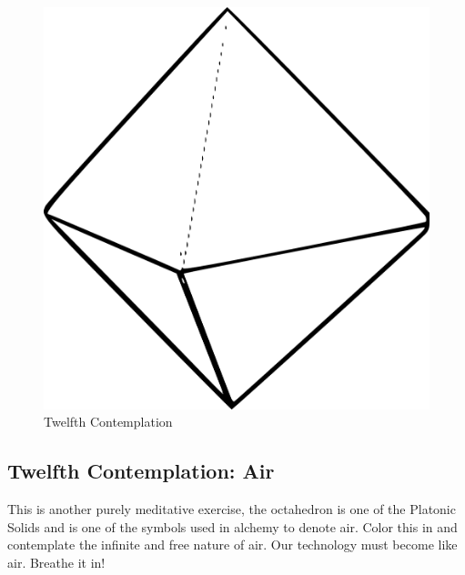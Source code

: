 \begin{figure}[htbp]
\centering
\includegraphics{images/contemplations/contemplation12C.png}
\caption{Twelfth Contemplation}
\end{figure}

\subsection{Twelfth Contemplation: Air}\label{twelfth-contemplation-air}

This is another purely meditative exercise, the octahedron is one of the
Platonic Solids and is one of the symbols used in alchemy to denote air.
Color this in and contemplate the infinite and free nature of air. Our
technology must become like air. Breathe it in!
